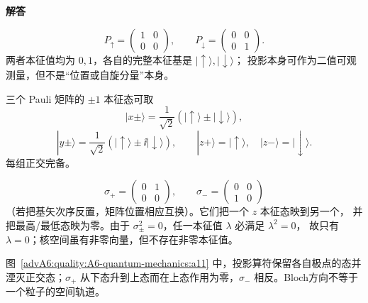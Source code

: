 \begin{advsolution}
\begin{center}\begin{minipage}{.96\linewidth}\centering
\raggedright{\bfseries\color{DeepBlue}解答}\par\smallskip\centering

\label{advA6:quality:A6-quantum-mechanics:a11}
\end{minipage}\end{center}

\[
 P_\uparrow=\begin{pmatrix}1&0\\0&0\end{pmatrix},\qquad
 P_\downarrow=\begin{pmatrix}0&0\\0&1\end{pmatrix}.
\]
两者本征值均为 $0,1$，各自的完整本征基是
$|\uparrow\rangle,|\downarrow\rangle$；
投影本身可作为二值可观测量，但不是“位置或自旋分量”本身。

三个 Pauli 矩阵的 $\pm1$ 本征态可取
\[
 |x\pm\rangle=\frac1{\sqrt2}
 (|\uparrow\rangle\pm|\downarrow\rangle),
\]
\[
 |y\pm\rangle=\frac1{\sqrt2}
 (|\uparrow\rangle\pm\ii|\downarrow\rangle),
\qquad
 |z+\rangle=|\uparrow\rangle,\quad
 |z-\rangle=|\downarrow\rangle.
\]
每组正交完备。

\[
 \sigma_+=
 \begin{pmatrix}0&1\\0&0\end{pmatrix},\qquad
 \sigma_-=
 \begin{pmatrix}0&0\\1&0\end{pmatrix}
\]
（若把基矢次序反置，矩阵位置相应互换）。它们把一个 $z$ 本征态映到另一个，
并把最高/最低态映为零。由于
$\sigma_\pm^2=0$，任一本征值 $\lambda$ 必满足 $\lambda^2=0$，
故只有 $\lambda=0$；核空间虽有非零向量，但不存在非零本征值。

图~\ref{advA6:quality:A6-quantum-mechanics:a11} 中，投影算符保留各自极点的态并湮灭正交态；$\sigma_+$ 从下态升到上态而在上态作用为零，$\sigma_-$ 相反。Bloch方向不等于一个粒子的空间轨道。
\end{advsolution}

